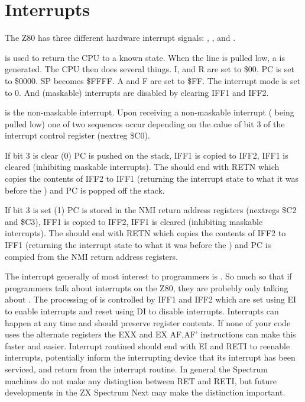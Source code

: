 \chapter{Interrupts}
The Z80 has three different hardware interrupt signals:
, , and .

 is used to return the CPU to a known state. When
the  line is pulled low, a  is
generated. The CPU then does several things. I, and R are set to \$00.
PC is set to \$0000. SP becomes \$FFFF. A and F are set to \$FF.  The
interrupt mode is set to 0. And (maskable) interrupts are disabled by
clearing IFF1 and IFF2.

 is the non-maskable interrupt. Upon receiving a
non-maskable interrupt ( being pulled low) one of
two sequences occur depending on the calue of bit 3 of the interrupt
control register (nextreg \$C0).



If bit 3 is clear (0) PC is pushed on the stack, IFF1 is copied to
IFF2, IFF1 is cleared (inhibiting maskable interrupts). The
 should end with RETN which copies the contents of
IFF2 to IFF1 (returning the interrupt state to what it was before the
) and PC is popped off the stack.

If bit 3 is set (1) PC is stored in the NMI return address registers
(nextregs \$C2 and \$C3), IFF1 is copied to IFF2, IFF1 is cleared
(inhibiting maskable interrupts). The  should end
with RETN which copies the contents of IFF2 to IFF1 (returning the
interrupt state to what it was before the ) and PC
is compied from the NMI return address registers.




The interrupt generally of most interest to programmers is
. So much so that if programmers talk about
interrupts on the Z80, they are probebly only talking about
. The processing of  is controlled
by IFF1 and IFF2 which are set using EI to enable interrupts and reset
using DI to disable interrupts. Interrupts can happen at any time and
should preserve register contents.  If none of your code uses the
alternate registers the EXX and EX AF,AF’ instructions can make this
faster and easier. Interrupt routined should end with EI and RETI to
reenable interrupts, potentially inform the interrupting device that
its interrupt has been serviced, and return from the interrupt
routine. In general the Spectrum machines do not make any distingtion
between RET and RETI, but future developments in the ZX Spectrum Next
may make the distinction important.


